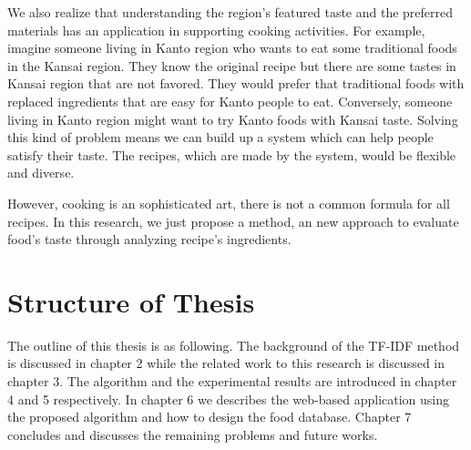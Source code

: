 \par We also realize that understanding the region's featured taste and the preferred materials has an application in supporting cooking activities. For example, imagine someone living in Kanto region who wants to eat some traditional foods in the Kansai region. They know the original recipe but there are some tastes in Kansai region that are not favored. They would prefer that traditional foods with replaced ingredients that are easy for Kanto people to eat. Conversely, someone living in Kanto region might want to try Kanto foods with Kansai taste. Solving this kind of problem means we can build up a system which can help people satisfy their taste. The recipes, which are made by the system, would be flexible and diverse.

However, cooking is an sophisticated art, there is not a common formula for all recipes. In this research, we just propose a method, an new approach to evaluate food's taste through analyzing recipe's ingredients.

\section{Structure of Thesis}\label{sec:intro_structure}

\par The outline of this thesis is as following. The background of the TF-IDF method is discussed in chapter 2 while the related work to this research is discussed in chapter 3. The algorithm and the experimental results are introduced in chapter 4 and 5 respectively. In chapter 6 we describes the web-based application using the proposed algorithm and how to design the food database. Chapter 7 concludes and discusses the remaining problems and future works.

 